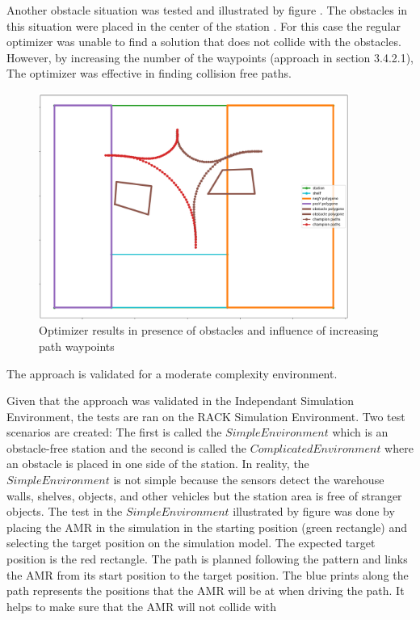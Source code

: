Another obstacle situation was tested and illustrated by figure .
The obstacles in this situation were placed in the center of the station . 
For this case the regular optimizer was unable to find a solution that does not collide 
with the obstacles. However, by increasing the number of the waypoints (approach in section 3.4.2.1),
The optimizer was effective in finding collision free paths. 


\begin{figure}[H]
    \begin{center}
        \includegraphics[width=4in]{images/Chap3/Figure_6.png} %
        \caption{Optimizer results in presence of obstacles and influence of increasing path waypoints}
        \label{OptResult3}
        \end{center}    
\end{figure}

The approach is validated for a moderate complexity environment.

Given that the approach was validated in the Independant Simulation Environment, the tests are 
ran on the RACK Simulation Environment. Two test scenarios are created: 
The first is called the \(Simple Environment\) which is an obstacle-free station and the second is
called the \(Complicated Environment\) where an obstacle is placed in one side of the station. 
In reality, the \(Simple Environment\) is not simple because the sensors detect the warehouse walls,
shelves, objects, and other vehicles but the station area is free of stranger objects.
The test in the \(Simple Environment\) illustrated by figure  was done by placing the 
AMR in the simulation in the starting position (green rectangle) and selecting the target position on 
the simulation model. The expected target position is the red rectangle. 
The path is planned following the pattern and links the AMR from its start position to the target position.
The blue prints along the path represents the positions that the AMR will be at when driving the path.
It helps to make sure that the AMR will not collide with  

